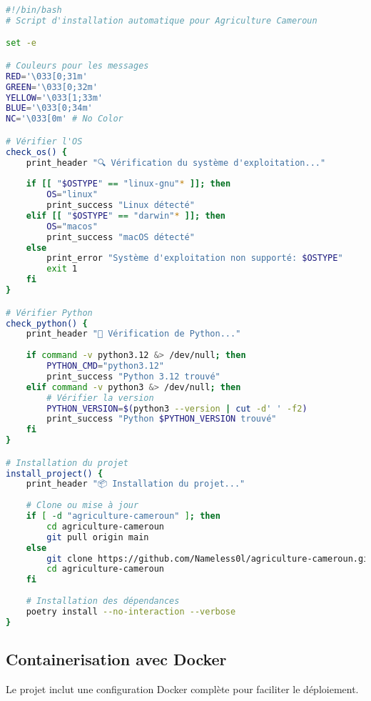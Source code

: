 \begin{lstlisting}[language=bash, caption=Script de déploiement local (setup.sh)]
#!/bin/bash
# Script d'installation automatique pour Agriculture Cameroun

set -e

# Couleurs pour les messages
RED='\033[0;31m'
GREEN='\033[0;32m'
YELLOW='\033[1;33m'
BLUE='\033[0;34m'
NC='\033[0m' # No Color

# Vérifier l'OS
check_os() {
    print_header "🔍 Vérification du système d'exploitation..."
    
    if [[ "$OSTYPE" == "linux-gnu"* ]]; then
        OS="linux"
        print_success "Linux détecté"
    elif [[ "$OSTYPE" == "darwin"* ]]; then
        OS="macos"
        print_success "macOS détecté"
    else
        print_error "Système d'exploitation non supporté: $OSTYPE"
        exit 1
    fi
}

# Vérifier Python
check_python() {
    print_header "🐍 Vérification de Python..."
    
    if command -v python3.12 &> /dev/null; then
        PYTHON_CMD="python3.12"
        print_success "Python 3.12 trouvé"
    elif command -v python3 &> /dev/null; then
        # Vérifier la version
        PYTHON_VERSION=$(python3 --version | cut -d' ' -f2)
        print_success "Python $PYTHON_VERSION trouvé"
    fi
}

# Installation du projet
install_project() {
    print_header "📦 Installation du projet..."
    
    # Clone ou mise à jour
    if [ -d "agriculture-cameroun" ]; then
        cd agriculture-cameroun
        git pull origin main
    else
        git clone https://github.com/Nameless0l/agriculture-cameroun.git
        cd agriculture-cameroun
    fi
    
    # Installation des dépendances
    poetry install --no-interaction --verbose
}
\end{lstlisting}

\subsection{Containerisation avec Docker}

Le projet inclut une configuration Docker complète pour faciliter le déploiement.

